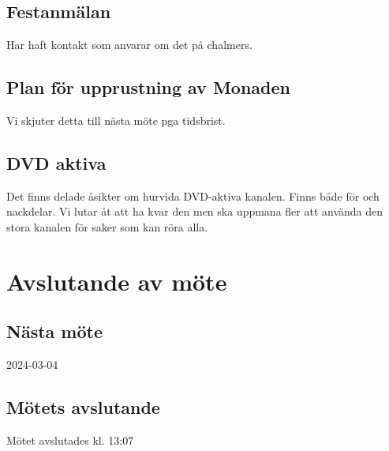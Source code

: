 \documentclass[protokoll]{dvd}
\begin{document}
\subsection*{Festanmälan}
Har haft kontakt som anvarar om det på chalmers.

\subsection*{Plan för upprustning av Monaden}
Vi skjuter detta till nästa möte pga tidsbrist.

\subsection*{DVD aktiva}
Det finns delade åsikter om hurvida DVD-aktiva kanalen. Finns både för och nackdelar.
Vi lutar åt att ha kvar den men ska uppmana fler att använda den stora kanalen för
saker som kan röra alla.


\newpage
\section{Avslutande av möte}

\subsection{Nästa möte} 
2024-03-04

\subsection{Mötets avslutande}
Mötet avslutades kl. 13:07

\styrelsesignaturer
\end{document}
